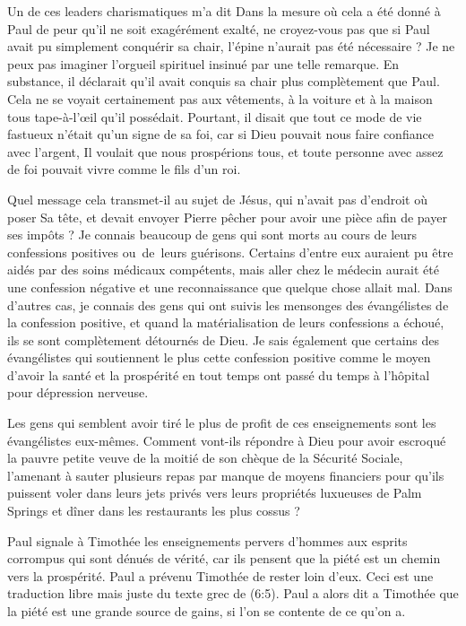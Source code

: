 Un de ces leaders charismatiques m'a dit\frcolon{}
 \Og Dans la mesure où cela a été donné à Paul de peur
 qu'il ne soit exagérément exalté, ne croyez-vous pas que si Paul
 avait pu simplement conquérir sa chair, l'épine n'aurait pas
 été nécessaire ? \Fg{}
 Je ne peux pas imaginer l'orgueil spirituel insinué par une telle remarque.
 En substance, il déclarait qu'il avait conquis sa chair
 plus complètement que Paul. Cela ne se voyait certainement pas
 aux vêtements, à la voiture et à la maison tous tape-à-l'œil
 qu'il possédait. Pourtant, il disait que tout ce mode de vie
 fastueux n'était qu'un signe de sa foi, car si Dieu pouvait nous faire
 confiance avec l'argent, Il voulait que nous prospérions tous,
 et toute personne avec assez de foi pouvait vivre comme le fils d'un roi.

Quel message cela transmet-il au sujet de Jésus, qui n'avait pas
 d'endroit où poser Sa tête, et devait envoyer Pierre pêcher
 pour avoir une pièce afin de payer ses impôts ? Je connais beaucoup de gens
 qui sont morts au cours de leurs confessions positives ou~de~leurs guérisons.
 Certains d'entre eux auraient pu être aidés par des soins médicaux
 compétents, mais aller chez le médecin aurait été une confession négative
 et une reconnaissance que quelque chose allait mal.
 Dans d'autres cas, je connais des gens qui ont suivis les mensonges
 des évangélistes de la confession positive, et quand la matérialisation
 de leurs confessions a échoué, ils se sont complètement détournés de Dieu.
 Je sais également que certains des évangélistes qui soutiennent
 le plus cette confession positive comme le moyen d'avoir la santé
 et la prospérité en tout temps ont passé du temps à l'hôpital
 pour dépression nerveuse.

Les gens qui semblent avoir tiré le plus de profit de ces enseignements
 sont les évangélistes eux-mêmes. Comment vont-ils répondre à Dieu
 pour avoir escroqué la pauvre petite veuve de la moitié de son chèque
 de la Sécurité Sociale, l'amenant à sauter plusieurs repas par manque
 de moyens financiers pour qu'ils puissent voler dans leurs jets privés
 vers leurs propriétés luxueuses de Palm Springs et dîner dans les
 restaurants les plus cossus ?

Paul signale à Timothée les enseignements pervers
 d'hom\-mes aux esprits corrompus qui sont dénués de vérité, car ils pensent
 que la piété est un chemin vers la prospérité.
 Paul a prévenu Timothée de rester loin d'eux.
 Ceci est une traduction libre mais juste du texte grec
 de (6:5).
 Paul a alors dit a Timothée que la piété est une grande source de gains,
 si l'on se contente de ce qu'on a.
\closechapter

